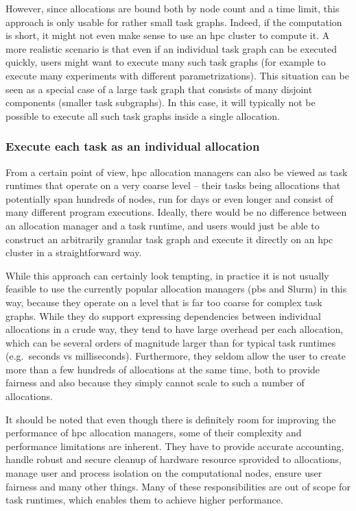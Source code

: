 However, since allocations are bound both by node count and a time limit, this approach is only
usable for rather small task graphs. Indeed, if the computation is short, it might not even make
sense to use an \gls{hpc} cluster to compute it. A more realistic scenario is
that even if an individual task graph can be executed quickly, users might want to execute many
such task graphs (for example to execute many experiments with different parametrizations). This
situation can be seen as a special case of a large task graph that consists of many disjoint
components (smaller task subgraphs). In this case, it will typically not be possible to execute all
such task graphs inside a single allocation.

\subsubsection*{Execute each task as an individual allocation}
From a certain point of view, \gls{hpc} allocation managers can also be viewed as
task runtimes that operate on a very coarse level -- their tasks being allocations that potentially
span hundreds of nodes, run for days or even longer and consist of many different program
executions. Ideally, there would be no difference between an allocation manager and a task runtime,
and users would just be able to construct an arbitrarily granular task graph and execute it
directly on an \gls{hpc} cluster in a straightforward way.

While this approach can certainly look tempting, in practice it is not usually feasible to use the
currently popular allocation managers (\gls{pbs} and Slurm) in this way, because
they operate on a level that is far too coarse for complex task graphs. While they do support
expressing dependencies between individual allocations in a crude way, they tend to have large
overhead per each allocation, which can be several orders of magnitude
larger than for typical task runtimes (e.g.\ seconds vs milliseconds). Furthermore, they seldom
allow the user to create more than a few hundreds of allocations at the same time, both to provide
fairness and also because they simply cannot scale to such a number of allocations.

It should be noted that even though there is definitely room for improving the performance of
\gls{hpc} allocation managers, some of their complexity and performance
limitations are inherent. They have to provide accurate accounting, handle robust and secure
cleanup of hardware resource sprovided to allocations, manage user and process isolation on the
computational nodes, ensure user fairness and many other things. Many of these responsibilities are
out of scope for task runtimes, which enables them to achieve higher performance.

